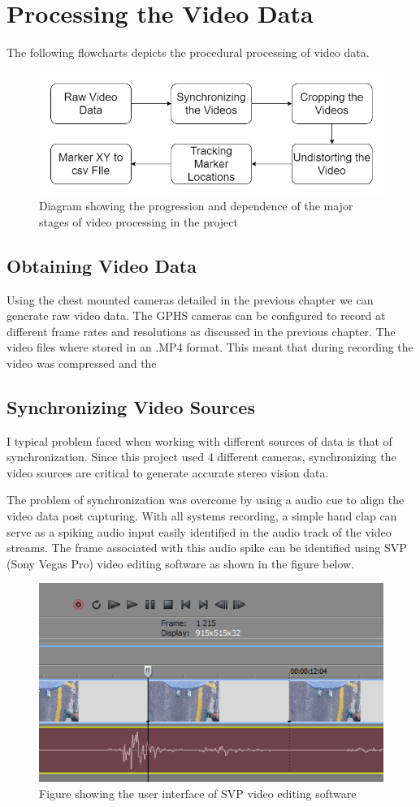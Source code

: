 \section{Processing the Video Data}
The following flowcharts depicts the procedural processing of video data.
\begin{figure}[!ht]
  \includegraphics[width=\linewidth]{figures/videoProcess.png}
  \caption{Diagram showing the progression and dependence of the major stages of video processing in the project}
  \label{fig:videoProcess}
\end{figure}

\subsection{Obtaining Video Data}
Using the chest mounted cameras detailed in the previous chapter we can generate raw video data. The GPHS cameras can be configured to record at different frame rates and resolutions as discussed in the previous chapter. The video files where stored in an .MP4 format. This meant that during recording the video was compressed and the 


\subsection{Synchronizing Video Sources}
I typical problem faced when working with different sources of data is that of synchronization. Since this project used 4 different cameras, synchronizing the video sources are critical to generate accurate stereo vision data.

The problem of synchronization was overcome by using a audio cue to align the video data post capturing. With all systems recording, a simple hand clap can serve as a spiking audio input easily identified in the audio track of the video streams. The frame associated with this audio spike can be identified using SVP (Sony Vegas Pro) video editing software as shown in the figure below. 

\begin{figure}[!ht]
\centering
  \includegraphics[width=0.5\linewidth]{figures/svpframe.png}
  \caption{Figure showing the user interface of SVP video editing software}
  \label{fig:svpframe}
\end{figure}

